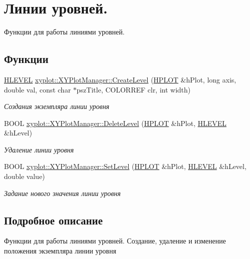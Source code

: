 \hypertarget{group__gr_lvl_ex}{\section{Линии уровней.}
\label{group__gr_lvl_ex}
}


Функции для работы линиями уровней.  


\subsection*{Функции}
\begin{DoxyCompactItemize}
\item 
\hyperlink{classxyplot_1_1_h_l_e_v_e_l}{H\-L\-E\-V\-E\-L} \hyperlink{group__gr_lvl_ex_gaf2ee73286c657c5cf07963143e74246d}{xyplot\-::\-X\-Y\-Plot\-Manager\-::\-Create\-Level} (\hyperlink{classxyplot_1_1_h_p_l_o_t}{H\-P\-L\-O\-T} \&h\-Plot, long axis, double val, const char $\ast$psz\-Title, C\-O\-L\-O\-R\-R\-E\-F clr, int width)
\begin{DoxyCompactList}\small\item\em Создания экземпляра линии уровня \end{DoxyCompactList}\item 
B\-O\-O\-L \hyperlink{group__gr_lvl_ex_ga1f2d9a5228e0b865b6bcc3b3d0929819}{xyplot\-::\-X\-Y\-Plot\-Manager\-::\-Delete\-Level} (\hyperlink{classxyplot_1_1_h_p_l_o_t}{H\-P\-L\-O\-T} \&h\-Plot, \hyperlink{classxyplot_1_1_h_l_e_v_e_l}{H\-L\-E\-V\-E\-L} \&h\-Level)
\begin{DoxyCompactList}\small\item\em Удаление линии уровня \end{DoxyCompactList}\item 
B\-O\-O\-L \hyperlink{group__gr_lvl_ex_gae55f0c1003d6676c068b3c621c42c156}{xyplot\-::\-X\-Y\-Plot\-Manager\-::\-Set\-Level} (\hyperlink{classxyplot_1_1_h_p_l_o_t}{H\-P\-L\-O\-T} \&h\-Plot, \hyperlink{classxyplot_1_1_h_l_e_v_e_l}{H\-L\-E\-V\-E\-L} \&h\-Level, double value)
\begin{DoxyCompactList}\small\item\em Задание нового значения линии уровня \end{DoxyCompactList}\end{DoxyCompactItemize}


\subsection{Подробное описание}
Функции для работы линиями уровней. Создание, удаление и изменение положения экземпляра линии уровня 

